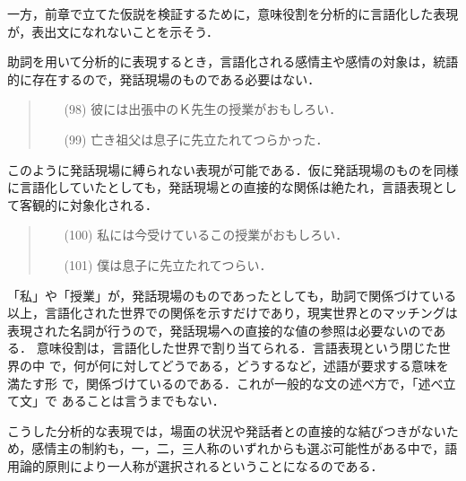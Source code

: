 一方，前章で立てた仮説を検証するために，意味役割を分析的に言語化した表現
が，表出文になれないことを示そう．

助詞を用いて分析的に表現するとき，言語化される感情主や感情の対象は，統語
的に存在するので，発話現場のものである必要はない．

\vspace{0.3cm}
\begin{quote}
\begin{itemize}
 \item[(98)] 彼には出張中のＫ先生の授業がおもしろい．
 \item[(99)] 亡き祖父は息子に先立たれてつらかった．
\end{itemize}
\end{quote}
\vspace{0.3cm}

このように発話現場に縛られない表現が可能である．仮に発話現場のものを同様
に言語化していたとしても，発話現場との直接的な関係は絶たれ，言語表現とし
て客観的に対象化される．

\vspace{0.3cm}
\begin{quote}
\begin{itemize}
 \item[(100)] 私には今受けているこの授業がおもしろい．
 \item[(101)] 僕は息子に先立たれてつらい．
\end{itemize}
\end{quote}
\vspace{0.3cm}

「私」や「授業」が，発話現場のものであったとしても，助詞で関係づけている
以上，言語化された世界での関係を示すだけであり，現実世界とのマッチングは
表現された名詞が行うので，発話現場への直接的な値の参照は必要ないのである．
意味役割は，言語化した世界で割り当てられる．言語表現という閉じた世界の中
で，何が何に対してどうである，どうするなど，述語が要求する意味を満たす形
で，関係づけているのである．これが一般的な文の述べ方で，「述べ立て文」で
あることは言うまでもない．

こうした分析的な表現では，場面の状況や発話者との直接的な結びつきがないた
め，感情主の制約も，一，二，三人称のいずれからも選ぶ可能性がある中で，語
用論的原則により一人称が選択されるということになるのである．

